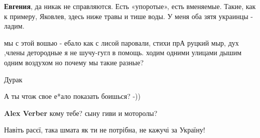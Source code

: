 \begin{itemize}
\begin{itemize}
\textbf{Евгения}, да никак не справляются. Есть «упоротые», есть вменяемые.
Такие, как к примеру, Яковлев, здесь ниже травы и тише воды. У меня оба зятя
украинцы - ладим.

\end{itemize}

 
мы с этой вошью - ебало как с лисой паровали, стихи прА руцкий мыр, дух ,члены
детородные я не шучу-гугл в помощь. ходим одними улицами дышим одним воздухом
но почему мы такие разные?

\begin{itemize}
 
Дурак

 
А ты чтож свое е*ало показать боишься? -))

 
\textbf{Alex Verber} кому тебе? сыну гиви и моторолы?
\end{itemize}

 
Навіть расєї, така шмата як ти не потрібна, не кажучі за Україну!

\begin{itemize}
 

\end{itemize}
\end{itemize}

